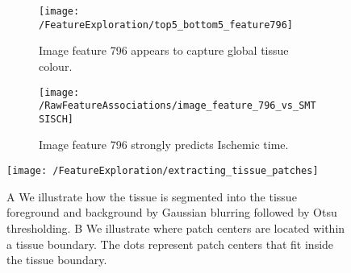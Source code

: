 \documentclass{article}
\begin{document}



\begin{figure}[H]
\begin{subfigure}{0.65\textwidth}
    \centering
    \texttt{[image: /FeatureExploration/top5\_bottom5\_feature796]}
    \caption{Image feature 796 appears to capture global tissue colour.}
    \label{fig:top5_bottom5_feature796}
\end{subfigure}
\begin{subfigure}{0.3\textwidth}
    \centering
    \texttt{[image: /RawFeatureAssociations/image\_feature\_796\_vs\_SMTSISCH]}
    \caption{Image feature 796 strongly predicts Ischemic time.}
    \label{fig:image_feature_796_vs_SMTSISCH}
 \end{subfigure}
 \caption{}
\end{figure}

\begin{figure}[H]
  \centering
    \texttt{[image: /FeatureExploration/extracting\_tissue\_patches]} 
  \caption{\textcolor{ao(english)}{A} We illustrate how the tissue is segmented into the tissue foreground and background by Gaussian blurring followed by Otsu thresholding. \textcolor{ao(english)}{B} We illustrate where patch centers are located within a tissue boundary. The dots represent patch centers that fit inside the tissue boundary.}
  \label{fig:extracting_tissue_patches}
\end{figure}
\end{document}
